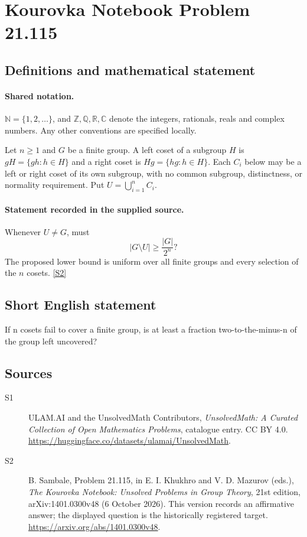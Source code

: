 \documentclass[11pt]{article}
\newcommand{\sref}[2]{\hyperlink{source:#1:#2}{[S#2]}}
\begin{document}
\section{Kourovka Notebook Problem 21.115}\label{statement}

\subsection{Definitions and mathematical statement}

\paragraph{Shared notation.}$\mathbb N=\{1,2,\ldots\}$, and $\mathbb Z,\mathbb Q,\mathbb R,\mathbb C$ denote the integers, rationals, reals and complex numbers. Any other conventions are specified locally.


Let $n\geq1$ and $G$ be a finite group. A left coset of a subgroup $H$ is $gH=\{gh:h\in H\}$ and a right coset is $Hg=\{hg:h\in H\}$. Each $C_i$ below may be a left or right coset of its own subgroup, with no common subgroup, distinctness, or normality requirement. Put $U=\bigcup_{i=1}^n C_i$.
\paragraph{Statement recorded in the supplied source.}
Whenever $U\ne G$, must
\[
 |G\setminus U|\geq\frac{|G|}{2^n}?
\]
The proposed lower bound is uniform over all finite groups and every selection of the $n$ cosets. \sref{statement}{2}
\subsection{Short English statement}
If n cosets fail to cover a finite group, is at least a fraction two-to-the-minus-n of the group left uncovered?
\subsection{Sources}
\begin{description}
\item[\hypertarget{source:statement:1}{S1}] ULAM.AI and the UnsolvedMath Contributors, \emph{UnsolvedMath: A Curated Collection of Open Mathematics Problems}, catalogue entry. CC BY 4.0. \url{https://huggingface.co/datasets/ulamai/UnsolvedMath}.
\item[\hypertarget{source:statement:2}{S2}] B. Sambale, Problem 21.115, in E. I. Khukhro and V. D. Mazurov (eds.), \emph{The Kourovka Notebook: Unsolved Problems in Group Theory}, 21st edition, arXiv:1401.0300v48 (6 October 2026). This version records an affirmative answer; the displayed question is the historically registered target. \url{https://arxiv.org/abs/1401.0300v48}.
\end{description}
\label{end:statement}
\end{document}
